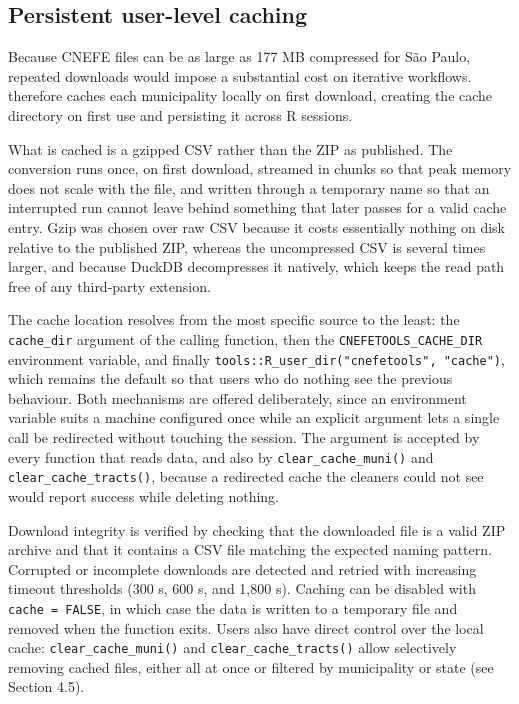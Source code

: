 \subsection{Persistent user-level caching}\label{persistent-user-level-caching}

Because CNEFE files can be as large as 177 MB compressed for São Paulo,
repeated downloads would impose a
substantial cost on iterative workflows.  therefore
caches each municipality locally on first download, creating the cache
directory on first use and persisting it across R sessions.

What is cached is a gzipped CSV rather than the ZIP as published. The
conversion runs once, on first download, streamed in chunks so that peak
memory does not scale with the file, and written through a temporary
name so that an interrupted run cannot leave behind something that later
passes for a valid cache entry. Gzip was chosen over raw CSV because it
costs essentially nothing on disk relative to the published ZIP, whereas
the uncompressed CSV is several times larger, and because DuckDB
decompresses it natively, which keeps the read path free of any
third-party extension.

The cache location resolves from the most specific source to the least:
the \texttt{cache\_dir} argument of the calling function, then the
\texttt{CNEFETOOLS\_CACHE\_DIR} environment variable, and finally
\texttt{tools::R\_user\_dir("cnefetools",\ "cache")}, which remains the default so
that users who do nothing see the previous behaviour. Both mechanisms
are offered deliberately, since an environment variable suits a machine
configured once while an explicit argument lets a single call be
redirected without touching the session. The argument is accepted by
every function that reads data, and also by \texttt{clear\_cache\_muni()} and
\texttt{clear\_cache\_tracts()}, because a redirected cache the cleaners could
not see would report success while deleting nothing.

Download integrity is verified by checking that the downloaded file is a
valid ZIP archive and that it contains a CSV file matching the expected
naming pattern. Corrupted or incomplete downloads are detected and
retried with increasing timeout thresholds (300 s, 600 s, and 1,800 s).
Caching can be disabled with \texttt{cache\ =\ FALSE}, in which case the data is
written to a temporary file and removed when the function exits. Users
also have direct control over the local cache: \texttt{clear\_cache\_muni()} and
\texttt{clear\_cache\_tracts()} allow selectively removing cached files, either
all at once or filtered by municipality or state (see Section 4.5).

